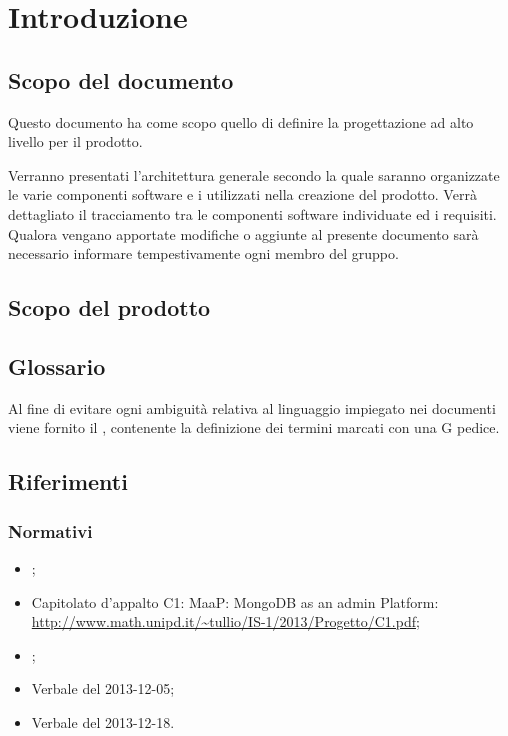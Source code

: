 \section{Introduzione}

\subsection{Scopo del documento}

Questo documento ha come scopo quello di definire la progettazione ad alto livello per il prodotto.

Verranno presentati l'architettura generale secondo la quale saranno organizzate le varie componenti software e i  utilizzati nella creazione del prodotto.
Verrà dettagliato il tracciamento tra le componenti software individuate ed i requisiti.
Qualora vengano apportate modifiche o aggiunte al presente documento sarà necessario informare tempestivamente ogni membro del gruppo.

\subsection{Scopo del prodotto}

\ScopoDelProdotto{}

\subsection{Glossario}

Al fine di evitare ogni ambiguità relativa al linguaggio impiegato nei documenti viene fornito il \Glossario{}, contenente la definizione dei termini marcati con una G pedice.

\subsection{Riferimenti}
	\label{Riferimenti}
	
		\subsubsection{Normativi}
		
		\begin{itemize}
		\item \NormeDiProgetto{};
		\item Capitolato d'appalto C1: MaaP: MongoDB as an admin Platform:\\
			\url{http://www.math.unipd.it/~tullio/IS-1/2013/Progetto/C1.pdf};
		\item \AnalisiDeiRequisiti{};  \\	
		\item Verbale del 2013-12-05; \\
		\item Verbale del 2013-12-18.
        \end{itemize}
        
